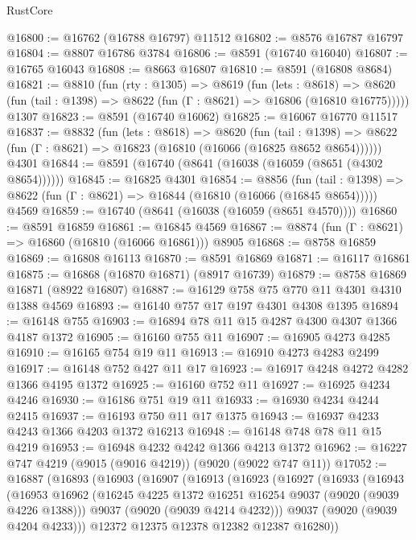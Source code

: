 \begin{lexlean}{RustCore}
\begin{coremodule}
@16800 := @16762 (@16788 @16797) @11512
@16802 := @8576 @16787 @16797
@16804 := @8807 @16786 @3784
@16806 := @8591 (@16740 @16040)
@16807 := @16765 @16043
@16808 := @8663 @16807
@16810 := @8591 (@16808 @8684)
@16821 := @8810
    (fun (rty : @1305) =>
    @8619
      (fun (lets : @8618) =>
      @8620 (fun (tail : @1398) => @8622 (fun (Γ : @8621) => @16806 (@16810 @16775)))))
    @1307
@16823 := @8591 (@16740 @16062)
@16825 := @16067 @16770 @11517
@16837 := @8832
    (fun (lets : @8618) =>
    @8620
      (fun (tail : @1398) =>
      @8622 (fun (Γ : @8621) => @16823 (@16810 (@16066 (@16825 @8652 @8654))))))
    @4301
@16844 := @8591 (@16740 (@8641 (@16038 (@16059 (@8651 (@4302 @8654))))))
@16845 := @16825 @4301
@16854 := @8856
    (fun (tail : @1398) => @8622 (fun (Γ : @8621) => @16844 (@16810 (@16066 (@16845 @8654)))))
    @4569
@16859 := @16740 (@8641 (@16038 (@16059 (@8651 @4570))))
@16860 := @8591 @16859
@16861 := @16845 @4569
@16867 := @8874 (fun (Γ : @8621) => @16860 (@16810 (@16066 @16861))) @8905
@16868 := @8758 @16859
@16869 := @16808 @16113
@16870 := @8591 @16869
@16871 := @16117 @16861
@16875 := @16868 (@16870 @16871) (@8917 @16739)
@16879 := @8758 @16869 @16871 (@8922 @16807)
@16887 := @16129 @758 @75 @770 @11 @4301 @4310 @1388 @4569
@16893 := @16140 @757 @17 @197 @4301 @4308 @1395
@16894 := @16148 @755
@16903 := @16894 @78 @11 @15 @4287 @4300 @4307 @1366 @4187 @1372
@16905 := @16160 @755 @11
@16907 := @16905 @4273 @4285
@16910 := @16165 @754 @19 @11
@16913 := @16910 @4273 @4283 @2499
@16917 := @16148 @752 @427 @11 @17
@16923 := @16917 @4248 @4272 @4282 @1366 @4195 @1372
@16925 := @16160 @752 @11
@16927 := @16925 @4234 @4246
@16930 := @16186 @751 @19 @11
@16933 := @16930 @4234 @4244 @2415
@16937 := @16193 @750 @11 @17 @1375
@16943 := @16937 @4233 @4243 @1366 @4203 @1372 @16213
@16948 := @16148 @748 @78 @11 @15 @4219
@16953 := @16948 @4232 @4242 @1366 @4213 @1372
@16962 := @16227 @747 @4219 (@9015 (@9016 @4219)) (@9020 (@9022 @747 @11))
@17052 := @16887
    (@16893
      (@16903
        (@16907
          (@16913
            (@16923
              (@16927
                (@16933
                  (@16943
                    (@16953
                      @16962
                      (@16245 @4225 @1372 @16251 @16254 @9037 (@9020 (@9039 @4226 @1388)))
                      @9037
                      (@9020 (@9039 @4214 @4232)))
                    @9037
                    (@9020 (@9039 @4204 @4233)))
                  @12372
                  @12375
                  @12378
                  @12382
                  @12387
                  @16280))

\end{coremodule}
\end{lexlean}
